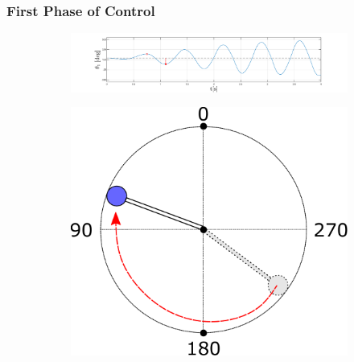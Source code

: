 \documentclass[]{beamer}
\begin{document}
\begin{frame}
	\frametitle{First Phase of Control}
	\begin{figure}[H]
		\centering
		\begin{subfigure}
			\centering
			\includegraphics[scale=0.25]{images/swings2/swing4.pdf}  
		\end{subfigure}
		\begin{subfigure}
			\centering
			\includegraphics[scale=0.25]{images/swing3.pdf}  
		\end{subfigure}
	\end{figure}
\end{frame}
\end{document}
